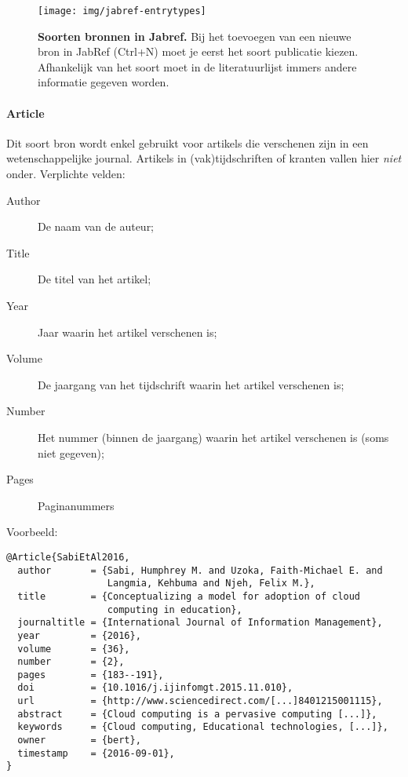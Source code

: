 \begin{figure}
  \centering
  \texttt{[image: img/jabref-entrytypes]}
  \caption[Soorten bronnen in JabRef]{\textbf{Soorten bronnen in Jabref.} Bij het toevoegen van een nieuwe bron in JabRef (Ctrl+N) moet je eerst het soort publicatie kiezen. Afhankelijk van het soort moet in de literatuurlijst immers andere informatie gegeven worden.}
  \label{fig:jabref-entrytypes}
\end{figure}

\paragraph{Article}

Dit soort bron wordt enkel gebruikt voor artikels die verschenen zijn in een wetenschappelijke journal. Artikels in (vak)tijdschriften of kranten vallen hier \emph{niet} onder. Verplichte velden:

\begin{description}
\item[Author] De naam van de auteur;
\item[Title] De titel van het artikel;
\item[Year] Jaar waarin het artikel verschenen is;
\item[Volume] De jaargang van het tijdschrift waarin het artikel verschenen is;
\item[Number] Het nummer (binnen de jaargang) waarin het artikel verschenen is (soms niet gegeven);
\item[Pages] Paginanummers
\end{description}

Voorbeeld:
\begin{verbatim}
@Article{SabiEtAl2016,
  author       = {Sabi, Humphrey M. and Uzoka, Faith-Michael E. and
                  Langmia, Kehbuma and Njeh, Felix M.},
  title        = {Conceptualizing a model for adoption of cloud
                  computing in education},
  journaltitle = {International Journal of Information Management},
  year         = {2016},
  volume       = {36},
  number       = {2},
  pages        = {183--191},
  doi          = {10.1016/j.ijinfomgt.2015.11.010},
  url          = {http://www.sciencedirect.com/[...]8401215001115},
  abstract     = {Cloud computing is a pervasive computing [...]},
  keywords     = {Cloud computing, Educational technologies, [...]},
  owner        = {bert},
  timestamp    = {2016-09-01},
}
\end{verbatim}

